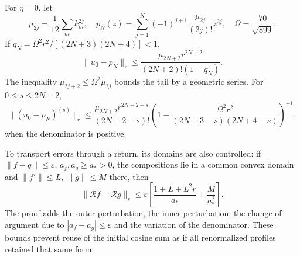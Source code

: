 For \(\eta=0\), let
\[
\mu_{2j}=\frac1{12}\sum_mk_m^{2j},\quad
p_N(z)=\sum_{j=1}^N(-1)^{j+1}\frac{\mu_{2j}}{(2j)!}z^{2j},
\quad\Omega=\frac{70}{\sqrt{899}}.
\]
If \(q_N=\Omega^2r^2/[(2N+3)(2N+4)]<1\),
\[
\|u_0-p_N\|_r\le
\frac{\mu_{2N+2}r^{2N+2}}{(2N+2)!(1-q_N)}.
\]
The inequality \(\mu_{2j+2}\le\Omega^2\mu_{2j}\) bounds the tail by a geometric series. For \(0\le s\le2N+2\),
\[
\|(u_0-p_N)^{(s)}\|_r\le
\frac{\mu_{2N+2}r^{2N+2-s}}{(2N+2-s)!}
\left(1-\frac{\Omega^2r^2}{(2N+3-s)(2N+4-s)}\right)^{-1},
\]
when the denominator is positive.

To transport errors through a return, its domains are also controlled: if \(\|f-g\|\le\varepsilon\), \(a_f,a_g\ge a_*>0\), the compositions lie in a common convex domain and \(\|f'\|\le L,\ \|g\|\le M\) there, then
\[
\|\mathcal Rf-\mathcal Rg\|_r
\le\varepsilon\left[\frac{1+L+L^2r}{a_*}+\frac{M}{a_*^2}\right].
\]
The proof adds the outer perturbation, the inner perturbation, the change of argument due to \(|a_f-a_g|\le\varepsilon\) and the variation of the denominator. These bounds prevent reuse of the initial cosine sum as if all renormalized profiles retained that same form.
